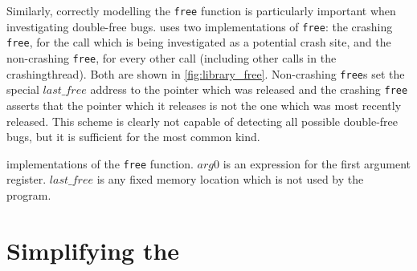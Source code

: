 Similarly, correctly modelling the \texttt{free} function is
particularly important when investigating double-free bugs.
{\Technique} uses two implementations of \texttt{free}: the crashing
\texttt{free}, for the call which is being investigated as a potential
crash site, and the non-crashing \texttt{free}, for every other call
(including other calls in the \gls{crashingthread}).  Both are shown
in \autoref{fig:library_free}.  Non-crashing \texttt{free}s set the
special $\mathit{last\_free}$ address to the pointer which was
released and the crashing \texttt{free} asserts that the pointer which
it releases is not the one which was most recently released.  This
scheme is clearly not capable of detecting all possible double-free
bugs, but it is sufficient for the most common kind.

\begin{sanefig}
  \centerline{
  }
  \vspace{-12pt}
  \caption{{\STateMachine} implementations of the {\tt free}
    function. $\mathit{arg0}$ is an expression for the first argument
    register.  $\mathit{last\_free}$ is any fixed memory location
    which is not used by the program.}
  \label{fig:library_free}
\end{sanefig}

\section{Simplifying the {\StateMachine}}
\label{sect:derive:simplify_sm}

